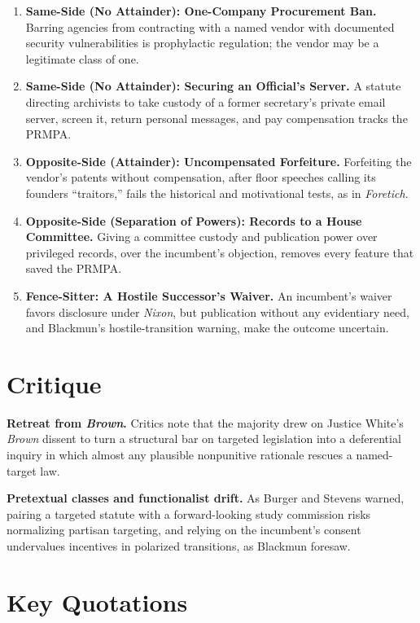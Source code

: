 \documentclass[12pt]{article}
\begin{document}
\begin{enumerate}
\item \textbf{Same-Side (No Attainder): One-Company Procurement Ban.} Barring agencies from contracting with a named vendor with documented security vulnerabilities is prophylactic regulation; the vendor may be a legitimate class of one.
\item \textbf{Same-Side (No Attainder): Securing an Official's Server.} A statute directing archivists to take custody of a former secretary's private email server, screen it, return personal messages, and pay compensation tracks the PRMPA.
\item \textbf{Opposite-Side (Attainder): Uncompensated Forfeiture.} Forfeiting the vendor's patents without compensation, after floor speeches calling its founders ``traitors,'' fails the historical and motivational tests, as in \textit{Foretich}.
\item \textbf{Opposite-Side (Separation of Powers): Records to a House Committee.} Giving a committee custody and publication power over privileged records, over the incumbent's objection, removes every feature that saved the PRMPA.
\item \textbf{Fence-Sitter: A Hostile Successor's Waiver.} An incumbent's waiver favors disclosure under \textit{Nixon}, but publication without any evidentiary need, and Blackmun's hostile-transition warning, make the outcome uncertain.
\end{enumerate}

\section{Critique}

\textbf{Retreat from \textit{Brown}.} Critics note that the majority drew on Justice White's \textit{Brown} dissent to turn a structural bar on targeted legislation into a deferential inquiry in which almost any plausible nonpunitive rationale rescues a named-target law.

\textbf{Pretextual classes and functionalist drift.} As Burger and Stevens warned, pairing a targeted statute with a forward-looking study commission risks normalizing partisan targeting, and relying on the incumbent's consent undervalues incentives in polarized transitions, as Blackmun foresaw.

\section{Key Quotations}
\end{document}
